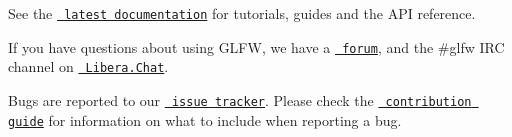 See the \href{https://www.glfw.org/docs/latest/}{\texttt{ latest documentation}} for tutorials, guides and the API reference.

If you have questions about using GLFW, we have a \href{https://discourse.glfw.org/}{\texttt{ forum}}, and the {\ttfamily \#glfw} IRC channel on \href{https://libera.chat/}{\texttt{ Libera.\+Chat}}.

Bugs are reported to our \href{https://github.com/glfw/glfw/issues}{\texttt{ issue tracker}}. Please check the \href{https://github.com/glfw/glfw/blob/master/docs/CONTRIBUTING.md}{\texttt{ contribution guide}} for information on what to include when reporting a bug. 